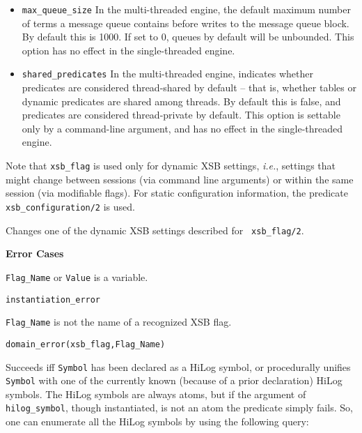 \begin{description}
\begin{itemize}
\item {\tt max\_queue\_size} In the multi-threaded engine, the default
  maximum number of terms a message queue contains before writes to
  the message queue block.  By default this is 1000.  If set to 0,
  queues by default will be unbounded.  This option has no effect in
  the single-threaded engine.

\item {\tt shared\_predicates} In the multi-threaded engine, indicates
  whether predicates are considered thread-shared by default -- that
  is, whether tables or dynamic predicates are shared among threads.
  By default this is false, and predicates are considered
  thread-private by default.  This option is settable only by a
  command-line argument, and has no effect in the
  single-threaded engine.

\end{itemize}
    
Note that {\tt xsb\_flag} is used only for dynamic XSB settings, {\it
  i.e.}, settings that might change between sessions (via command line
arguments) or within the same session (via modifiable flags).  For
static configuration information, the predicate {\tt
  xsb\_configuration/2} is used. 


%
Changes one of the dynamic XSB settings described for {\tt
  xsb\_flag/2}.

{\bf Error Cases}
\bi
\item 	{\tt Flag\_Name} or {\tt Value} is a variable.
\bi
\item 	{\tt instantiation\_error}
\ei
%
\item 	{\tt Flag\_Name} is not the name of a recognized XSB flag.
\bi
\item 	{\tt domain\_error(xsb\_flag,Flag\_Name)}
\ei

\ei


    Succeeds iff {\tt Symbol} has been declared as a HiLog symbol, or 
    procedurally unifies {\tt Symbol} with one of the currently known 
    (because of a prior declaration) HiLog symbols. The HiLog symbols
    are always atoms, but if the argument of {\tt hilog\_symbol},
    though instantiated, is not an atom the predicate simply fails.
    So, one can enumerate all the HiLog symbols by using the following
    query:



\end{description}
